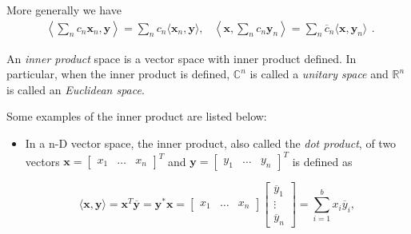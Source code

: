 \documentclass[10pt,b5paper,titlepage]{book}
\begin{document}
\begin{itemize}
\begin{itemize}
                More generally we have
                 \begin{equation}
                     \begin{array}{lr}
                         \left\langle \sum_{n} c_n \mathbf{x}_{n}, \mathbf{y} \right\rangle
                         = \sum_{n} c_n \langle \mathbf{x}_{n}, \mathbf{y} \rangle, &
                         \left\langle \mathbf{x}, \sum_{n} c_{n} \mathbf{y}_{n} \right\rangle
                         = \sum_{n} \overline{c}_{n} \langle \mathbf{x}, \mathbf{y}_{n} \rangle
                     \end{array}
                .\end{equation}
        \end{itemize}

        An \textit{inner product} space is a vector space with inner
        product defined. In particular, when the inner product is defined,
        $\mathbb{C}^{n}$ is called a \textit{unitary space} and $\mathbb{R}^{n}$
        is called an \textit{Euclidean space}.

        Some examples of the inner product are listed below:

        \begin{itemize}
            \item In a n-D vector space, the inner product, also called
                the \textit{dot product}, of two vectors
                $\mathbf{x} = \begin{bmatrix} x_1 & \ldots & x_n \end{bmatrix}^{T}$
                and $\mathbf{y} = \begin{bmatrix} y_1 & \ldots & y_n \end{bmatrix}^{T}$
                is defined as

                \begin{equation}
                    \langle \mathbf{x}, \mathbf{y} \rangle
                    = \mathbf{x}^{T} \overline{\mathbf{y}}
                    = \mathbf{y}^{*} \mathbf{x}
                    = \begin{bmatrix} x_1 & \ldots & x_n \end{bmatrix}
                    \begin{bmatrix} \overline{y}_1\\ \vdots\\ \overline{y}_n \end{bmatrix}
                    = \sum_{i=1}^{b} x_{i} \overline{y}_{i}
                ,\end{equation}


\end{itemize}
\end{itemize}
\end{document}
